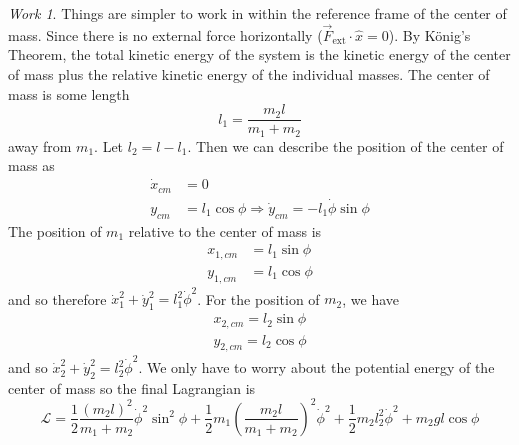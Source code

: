 \documentclass{article}
\theoremstyle{definition}
\theoremstyle{remark}
\newtheorem*{work}{Work}
\begin{document}
\begin{work}
    Things are simpler to work in within the reference frame of the center of mass. Since there is no external force horizontally ($\vec{F}_{\text{ext}} \cdot \hat x=0$). By K\"onig's Theorem, the total kinetic energy of the system is the kinetic energy of the center of mass plus the relative kinetic energy of the individual masses. The center of mass is some length 
    \begin{equation*}
        l_1 = \frac{m_2 l}{m_1+m_2}
    \end{equation*}
    away from $m_1$. Let $l_2 = l-l_1$. Then we can describe the position of the center of mass as 
    \begin{equation*}
        \begin{split}
            \dot x_{cm} &= 0 \\
            y_{cm} &=l_1\cos \phi \Rightarrow \dot y_{cm} =-l_1\dot \phi \sin \phi
        \end{split}
    \end{equation*}
    The position of $m_1$ relative to the center of mass is 
    \begin{equation*}
        \begin{split}
            x_{1,cm} &= l_1 \sin \phi  \\
            y_{1,cm} &=l_1\cos \phi
        \end{split}
    \end{equation*}
    and so therefore $\dot x^2_1+\dot y^2_1 = l_1^2\dot \phi^2$. For the position of $m_2$, we have 
    \begin{equation*}
        \begin{split}
            x_{2,cm} = l_2\sin \phi \\
            y_{2,cm} = l_2\cos \phi
        \end{split}
    \end{equation*}
    and so $\dot x_2^2+\dot y_2^2 = l_2^2\dot \phi^2$. We only have to worry about the potential energy of the center of mass so the final Lagrangian is 
    \begin{equation*}
        \mathscr{L} = \frac{1}{2} \frac{(m_2 l)^2}{m_1+m_2} \dot \phi^2 \sin^2 \phi + \frac{1}{2} m_1 \left(\frac{m_2 l}{m_1+m_2} \right) ^2 \dot \phi^2 + \frac{1}{2} m_2 l_2^2 \dot \phi^2 + m_2gl \cos \phi
    \end{equation*}
\end{work}
\end{document}
